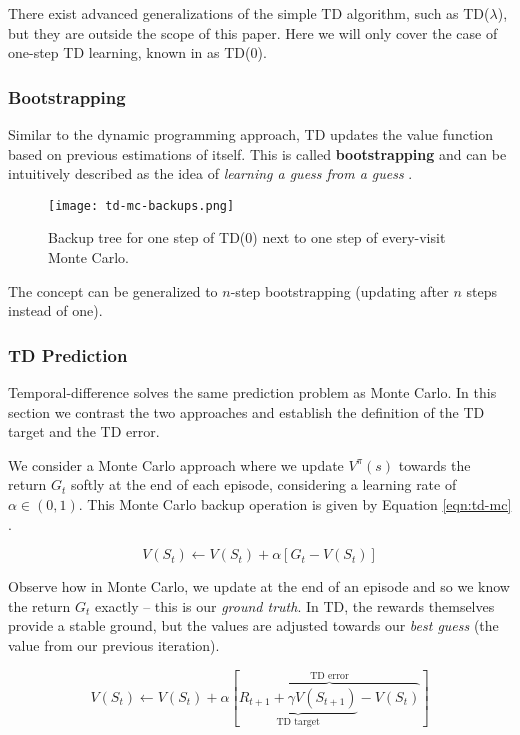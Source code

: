 There exist advanced generalizations of the simple TD algorithm, such as TD($\lambda$), but they are outside the scope of this paper.
Here we will only cover the case of one-step TD learning, known in \cite{rlai} as TD(0).

\subsubsection{Bootstrapping}
Similar to the dynamic programming approach, TD updates the value function based on previous estimations of itself.
This is called \textbf{bootstrapping} and can be intuitively described as the idea of \emph{learning a guess from a guess} \cite{rlai}.
\begin{figure}[h]
    \texttt{[image: td-mc-backups.png]}
    \centering
    \caption{Backup tree for one step of TD(0) next to one step of every-visit Monte Carlo.}
\end{figure}

The concept can be generalized to $n$-step bootstrapping (updating after $n$ steps instead of one).

\subsubsection{TD Prediction}
Temporal-difference solves the same prediction problem as Monte Carlo.
In this section we contrast the two approaches and establish the definition of the TD target and the TD error.

We consider a Monte Carlo approach where we update $V^{\pi}(s)$ towards the return $G_t$ softly at the end of each episode, considering a learning rate of $\alpha \in (0, 1)$.
This Monte Carlo backup operation is given by Equation \ref{eqn:td-mc} \cite{rlai}.

\begin{equation} \label{eqn:td-mc}
    V(S_t) \leftarrow  V(S_t) + \alpha[G_t - V(S_t)]
\end{equation}

Observe how in Monte Carlo, we update at the end of an episode and so we know the return $G_t$ exactly -- this is our \emph{ground truth}.
In TD, the rewards themselves provide a stable ground, but the values are adjusted towards our \emph{best guess} (the value from our previous iteration).

\begin{equation} \label{eqn:td-td}
    V(S_t) \leftarrow  V(S_t) + \alpha[
        \overbrace{\underbrace{R_{t+1} + \gamma V(S_{t+1})}_\text{TD target} - V(S_t)}^\text{TD error}
    ]
\end{equation}

